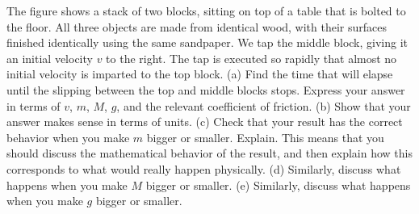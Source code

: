 The figure shows a stack of two blocks, sitting on top of a table that is bolted to the floor.
All three objects are made from identical wood, with their surfaces finished identically using
the same sandpaper. We tap the middle block, giving it an initial velocity $v$ to the right.
The tap is executed so rapidly that almost no initial velocity is imparted to the top block.\hwendpart
%
(a) Find the time that will elapse until the slipping between the top and middle blocks stops.
Express your answer in terms of $v$, $m$, $M$, $g$, and the relevant coefficient of friction.\answercheck\hwendpart
%
(b) Show that your answer makes sense in terms of units.\hwendpart
%
(c)  Check that your result has the correct behavior when you
  make $m$ bigger or smaller. Explain. This means that you should
  discuss the mathematical behavior of the result, and then explain
  how this corresponds to what would really happen physically.\hwendpart
%
  (d) Similarly, discuss what happens when you make $M$ bigger or smaller.\hwendpart
%
  (e) Similarly, discuss what happens when you make $g$ bigger or smaller.

